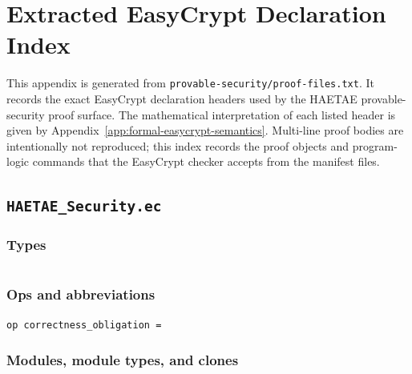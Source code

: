\chapter{Extracted EasyCrypt Declaration Index}
\label{app:easycrypt-declaration-index}

\providecommand{\ecfile}[1]{\nolinkurl{#1}}

This appendix is generated from \ecfile{provable-security/proof-files.txt}.  It records the exact EasyCrypt declaration headers used by the HAETAE provable-security proof surface.  The mathematical interpretation of each listed header is given by Appendix~\ref{app:formal-easycrypt-semantics}.  Multi-line proof bodies are intentionally not reproduced; this index records the proof objects and program-logic commands that the EasyCrypt checker accepts from the manifest files.

\section*{\ecfile{HAETAE_Security.ec}}

\subsection*{Types}
\begin{lstlisting}[language=EasyCrypt,basicstyle=\ttfamily\tiny]
\end{lstlisting}

\subsection*{Ops and abbreviations}
\begin{lstlisting}[language=EasyCrypt,basicstyle=\ttfamily\tiny]
op correctness_obligation =
\end{lstlisting}

\subsection*{Modules, module types, and clones}
\begin{lstlisting}[language=EasyCrypt,basicstyle=\ttfamily\tiny]
\end{lstlisting}

